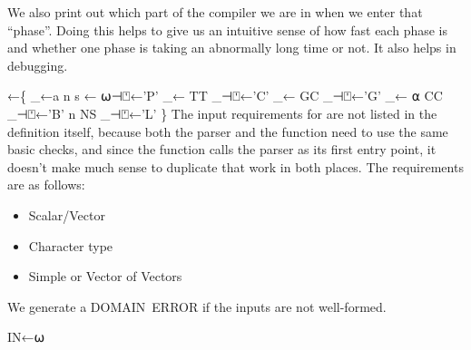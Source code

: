 \documentclass{article}%
\begin{document}
We also print out which part of the compiler we are in when we
enter that ``phase''. Doing this helps to give us an intuitive sense
of how fast each phase is and whether one phase is taking an
abnormally long time or not.
It also helps in debugging.

\nwenddocs{}\endmoddef\nwstartdeflinemarkup{}\nwenddeflinemarkup
{}←\{
        _←a n s ← ⍵⊣⍞←'P'
        _←          TT _⊣⍞←'C'
        _←          GC _⊣⍞←'G'
        _←        ⍺ CC _⊣⍞←'B'
                  n NS _⊣⍞←'L'
\}
\eatline
{}\nwendcode{}\nwdocspar
The input requirements for {\Tt{}\nwendquote} are not listed in the definition
itself, because both the parser {\Tt{}\nwendquote} and the {\Tt{}\nwendquote} function
need to use the same basic checks,
and since the {\Tt{}\nwendquote} function calls the parser
as its first entry point,
it doesn't make much sense to
duplicate that work in both places.
The requirements are as follows:

\begin{itemize}
        \item Scalar/Vector
        \item Character type
        \item Simple or Vector of Vectors
\end{itemize}

\noindent
We generate a {\Tt{}DOMAIN\ ERROR\nwendquote} if the inputs are not well-formed.

\nwenddocs{}\endmoddef\nwstartdeflinemarkup{}\nwenddeflinemarkup
IN←⍵
\end{document}
